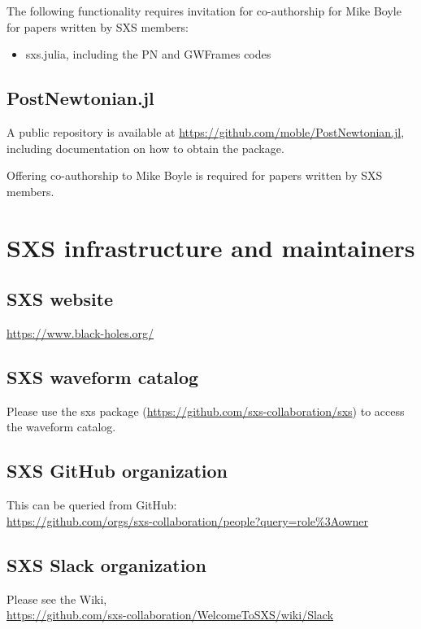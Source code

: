 \documentclass[12pt]{article}
\begin{document}
The following functionality requires invitation for co-authorship for Mike Boyle
for papers written by SXS members:
\vspace{-0.5em}
\begin{itemize}
\item sxs.julia, including the PN and GWFrames codes
\end{itemize}

\subsection{PostNewtonian.jl}
A public repository is available at
\url{https://github.com/moble/PostNewtonian.jl}, including documentation on how
to obtain the package.

Offering co-authorship to Mike Boyle is required for papers written by SXS
members.

\section{SXS infrastructure and
  maintainers}\label{sec:current_infrastructure}
\subsection{ SXS website}
\url{https://www.black-holes.org/}
\subsection{ SXS waveform catalog}
Please use the sxs package (\url{https://github.com/sxs-collaboration/sxs}) to
access the waveform catalog.
\subsection{ SXS GitHub organization}
This can be queried from GitHub:\\
\url{https://github.com/orgs/sxs-collaboration/people?query=role\%3Aowner}
\subsection{ SXS Slack organization}
Please see the Wiki, \\
\url{https://github.com/sxs-collaboration/WelcomeToSXS/wiki/Slack}
\end{document}
